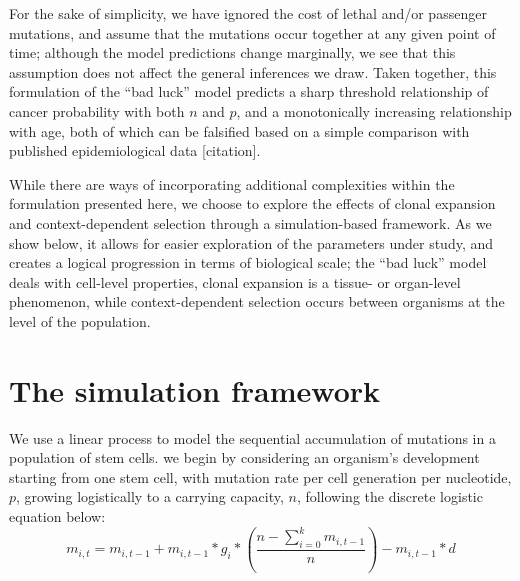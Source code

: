 \documentclass[9pt,twocolumn,twoside]{pnas-new}
\begin{document}
For the sake of simplicity, we have ignored the cost of lethal and/or passenger mutations, and assume that the mutations occur together at any given point of time; although the model predictions change marginally, we see that this assumption does not affect the general inferences we draw. Taken together, this formulation of the ``bad luck'' model predicts a sharp threshold relationship of cancer probability with both $n$ and $p$, and a monotonically increasing relationship with age, both of which can be falsified based on a simple comparison with published epidemiological data [citation].

While there are ways of incorporating additional complexities within the formulation presented here, we choose to explore the effects of clonal expansion and context-dependent selection through a simulation-based framework. As we show below, it allows for easier exploration of the parameters under study, and creates a logical progression in terms of biological scale; the ``bad luck'' model deals with cell-level properties, clonal expansion is a tissue- or organ-level phenomenon, while context-dependent selection occurs between organisms at the level of the population.

\section*{The simulation framework}
We use a linear process to model the sequential accumulation of mutations in a population of stem cells. we begin by considering an organism's development starting from one stem cell, with mutation rate per cell generation per nucleotide, $p$, growing logistically to a carrying capacity, $n$, following the discrete logistic equation below:
\begin{equation}
	m_{i, t} = m_{i, t-1} + m_{i, t-1}*g_{i}*(\dfrac{n-\sum_{i=0}^{k} m_{i, t-1}}{n}) - m_{i, t-1}*d
	\label{E3}	
\end{equation}
\end{document}
